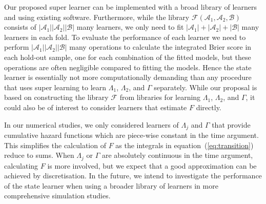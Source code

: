 \documentclass[unnumsec,webpdf,contemporary,large,namedate]{oup-authoring-template}%
\theoremstyle{thmstyleone}%
\theoremstyle{thmstyletwo}%
\theoremstyle{thmstylethree}%
\newcommand{\1}{\mathds{1}}
\begin{document}
Our proposed super learner can be implemented with a broad library of learners
and using existing software.
Furthermore, while
the library \( \mathcal{F}(\mathcal{A}_1,\mathcal{A}_2,\mathcal{B}) \) consists
of \( |\mathcal{A}_1||\mathcal{A}_2||\mathcal{B}| \) many learners, we only need to fit
\( |\mathcal{A}_1| +|\mathcal{A}_2| + |\mathcal{B}| \) many learners in each fold. To
evaluate the performance of each learner we need to perform
\( |\mathcal{A}_1||\mathcal{A}_2||\mathcal{B}| \) many operations to calculate the
integrated Brier score in each hold-out sample, one for each combination of the
fitted models, but these operations are often negligible compared to fitting the
models. Hence the state learner is essentially not more computationally demanding
than any procedure that uses super learning to learn $\Lambda_1$, $\Lambda_2$,
and $\Gamma$ separately. While our proposal is based on constructing the library
\( \mathcal{F} \) from libraries for learning \( \Lambda_1 \), $\Lambda_2$, and
$\Gamma$, it could also be of interest to consider learners that estimate
\( F \) directly.

In our numerical studies, we only considered learners of $\Lambda_j$ and
$\Gamma$ that provide cumulative hazard functions which are piece-wise constant
in the time argument. This simplifies the calculation of \( F \) as the
integrals in equation~(\ref{eq:transition}) reduce to sums. When $\Lambda_j$ or
\( \Gamma \) are absolutely continuous in the time argument, calculating \( F \)
is more involved, but we expect that a good approximation can be achieved by
discretisation. In the future, we intend to investigate the performance of the
state learner when using a broader library of learners in more comprehensive
simulation studies.
\end{document}
